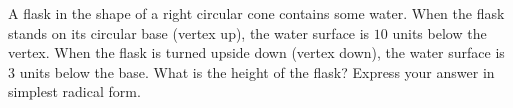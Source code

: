 A flask in the shape of a right circular cone contains some water. When the flask stands on its circular base (vertex up), the water surface is \(10\) units below the vertex. When the flask is turned upside down (vertex down), the water surface is \(3\) units below the base. What is the height of the flask? Express your answer in simplest radical form.
